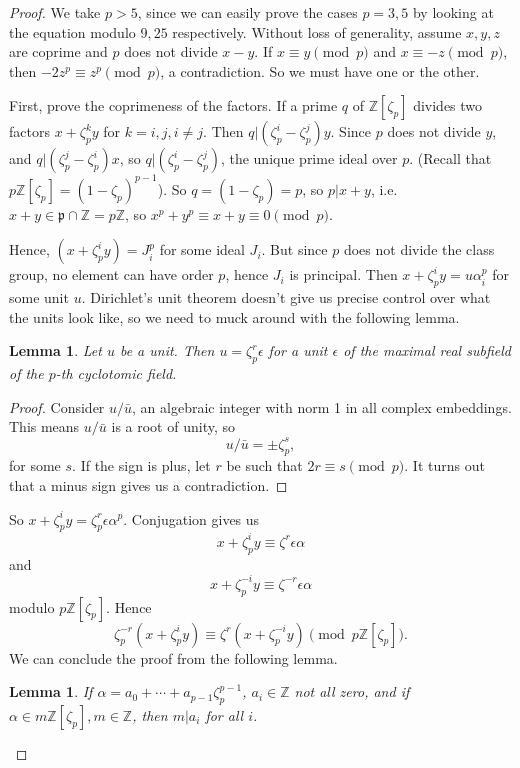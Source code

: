 \documentclass[letterpaper, 12pt]{article}
\newtheorem{lem}[thm]{Lemma}
\renewcommand{\prime}{\mathfrak{p}}
\begin{document}
\begin{proof}

We take $p > 5$, since we can easily prove the cases $p = 3,
5$ by looking at the equation modulo $9, 25$ respectively. Without loss of
generality, assume $x, y, z$ are coprime and $p$ does not divide $x - y$. If
$x \equiv y \pmod p$ and $x \equiv -z \pmod p$, then $-2z^p \equiv z^p \pmod
p$, a contradiction. So we must have one or the other.

First, prove the coprimeness of the factors. If a prime $q$ of
$\mathbb{Z}[\zeta_p]$ divides two factors $x + \zeta_p^k y$ for $k = i, j, i
\neq j$. Then $q | (\zeta_p^i - \zeta_p^j) y$. Since $p$ does not divide
$y$, and $q | (\zeta_p^j - \zeta_p^i) x$, so $q | (\zeta_p^i - \zeta_p^j)$,
the unique prime ideal over $p$. (Recall that $p \mathbb{Z}[\zeta_p] = (1 -
\zeta_p)^{p - 1}$). So $q = (1 - \zeta_p) = p$, so $p | x + y$, i.e. $x + y
\in \prime \cap \mathbb{Z} = p\mathbb{Z}$, so $x^p + y^p \equiv x + y \equiv
0 \pmod p$.

Hence, $(x + \zeta_p^i y) = J_i^p$ for some ideal $J_i$. But since $p$ does
not divide the class group, no element can have order $p$, hence $J_i$ is
principal. Then $x + \zeta_p^i y = u \alpha_i^p$ for some unit $u$.
Dirichlet's unit theorem doesn't give us precise control over what the units
look like, so we need to muck around with the following lemma.

\begin{lem}

Let $u$ be a unit. Then $u = \zeta_p^r \epsilon$ for a unit $\epsilon$ of the
maximal real subfield of the $p$-th cyclotomic field.

\end{lem}
\begin{proof}

Consider $u / \bar{u}$, an algebraic integer with norm 1 in all complex
embeddings. This means $u/\bar{u}$ is a root of unity, so \[u/\bar{u} = \pm
\zeta_p^s,\] for some $s$. If the sign is plus, let $r$ be such that $2r
\equiv s \pmod p$. It turns out that a minus sign gives us a contradiction.

\end{proof}

So $x + \zeta_p^i y = \zeta_p^r \epsilon \alpha^p$. Conjugation gives us \[x +
\zeta_p^i y \equiv \zeta^r \epsilon \alpha \] and \[ x + \zeta_p^{-i} y \equiv
\zeta^{-r} \epsilon \alpha \] modulo $p \mathbb{Z}[\zeta_p]$. Hence \[
\zeta_p^{-r} ( x + \zeta_p^i y) \equiv \zeta^r ( x + \zeta_p^{-i} y)
\pmod{p\mathbb{Z}[\zeta_p]}. \] We can conclude the proof from the following
lemma.

\begin{lem}

If $\alpha = a_0 + \cdots + a_{p - 1} \zeta_p^{p - 1}$, $a_i \in \mathbb{Z}$
not all zero, and if $\alpha \in m \mathbb{Z}[\zeta_p], m \in \mathbb{Z}$,
then $m | a_i$ for all $i$.

\end{lem}
\end{proof}
\end{document}
